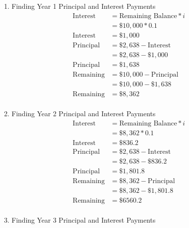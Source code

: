 \documentclass[../INDE250HW.tex]{subfiles}
\begin{document}
\begin{enumerate}
    \item Finding Year 1 Principal and Interest Payments
    \begin{equation*}
        \begin{aligned}
            \text{Interest} &= \text{Remaining Balance} * i \\
                            &= \$10,000 * 0.1 \\
            \text{Interest} &= \$1,000 \\
            \text{Principal} &= \$2,638 - \text{Interest} \\
                             &= \$2,638 - \$1,000 \\
            \text{Principal} &= \$1,638 \\  
            \text{Remaining} &= \$10,000 - \text{Principal} \\
                             &= \$10,000 - \$1,638 \\
            \text{Remaining} &= \$8,362 \\
        \end{aligned}
    \end{equation*} 
    \item Finding Year 2 Principal and Interest Payments
    \begin{equation*}
        \begin{aligned}
            \text{Interest} &= \text{Remaining Balance} * i \\
                            &= \$8,362 * 0.1 \\
            \text{Interest} &= \$836.2 \\
            \text{Principal} &= \$2,638 - \text{Interest} \\
                             &= \$2,638 - \$836.2 \\
            \text{Principal} &= \$1,801.8 \\
            \text{Remaining} &= \$8,362 - \text{Principal} \\
                             &= \$8,362 - \$1,801.8 \\
            \text{Remaining} &= \$6560.2 \\
        \end{aligned}
    \end{equation*} 
    \item Finding Year 3 Principal and Interest Payments
    \begin{equation*}
        \begin{aligned}

\end{aligned}
\end{equation*}
\end{enumerate}
\end{document}
